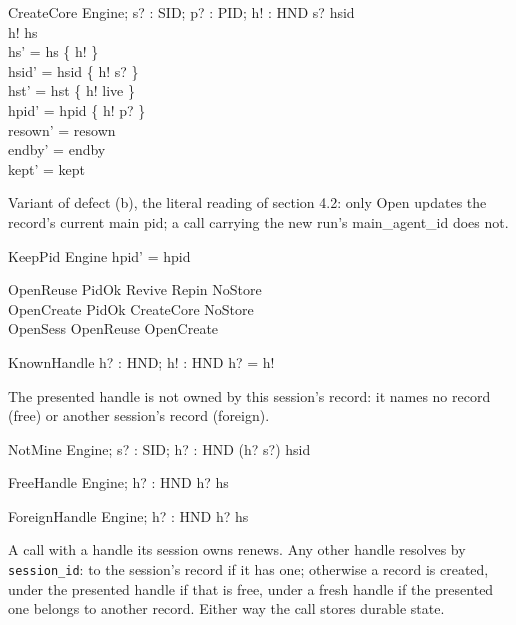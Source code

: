 \documentclass[a4paper,10pt,fleqn]{article}
\begin{document}
\begin{schema}{CreateCore}
  \Delta Engine; s? : SID; p? : PID; h! : HND
\where
  s? \notin \ran hsid \\
  h! \notin hs \\
  hs' = hs \cup \{ h! \} \\
  hsid' = hsid \cup \{ h! \mapsto s? \} \\
  hst' = hst \cup \{ h! \mapsto live \} \\
  hpid' = hpid \cup \{ h! \mapsto p? \} \\
  resown' = resown \\
  endby' = endby \\
  kept' = kept
\end{schema}

Variant of defect (b), the literal reading of section 4.2: only Open updates
the record's current main pid; a call carrying the new run's main\_agent\_id
does not.

\begin{schema}{KeepPid}
  \Delta Engine
\where
  hpid' = hpid
\end{schema}

\begin{zed}
  OpenReuse  PidOk \land Revive \land Repin \land NoStore \\
  OpenCreate  PidOk \land CreateCore \land NoStore \\
  OpenSess  OpenReuse \lor OpenCreate
\end{zed}

\begin{schema}{KnownHandle}
  h? : HND; h! : HND
\where
  h? = h!
\end{schema}

The presented handle is not owned by this session's record: it names no record
(free) or another session's record (foreign).

\begin{schema}{NotMine}
  Engine; s? : SID; h? : HND
\where
  (h? \mapsto s?) \notin hsid
\end{schema}

\begin{schema}{FreeHandle}
  Engine; h? : HND
\where
  h? \notin hs
\end{schema}

\begin{schema}{ForeignHandle}
  Engine; h? : HND
\where
  h? \in hs
\end{schema}

A call with a handle its session owns renews.  Any other handle resolves by
\texttt{session\_id}: to the session's record if it has one; otherwise a record
is created, under the presented handle if that is free, under a fresh handle if
the presented one belongs to another record.  Either way the call stores
durable state.
\end{document}
